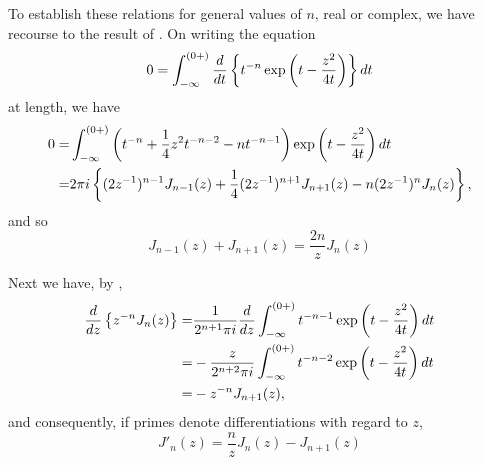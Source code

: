 \documentclass{book}
\begin{document}
To establish these relations for general values of $n$, real or
complex, we have recourse to the result of .
On writing the equation
$$
0 = \int_{-\infty}^{(0+)} \frac{d}{dt} \left\{  t^{-n}
  \exp\left(  t - \frac{z^2}{4t}   \right)   \right\} d t
$$
at length, we have
\begin{align*}
0 =& \int_{-\infty}^{(0+)}
\theparen{ t^{-n} + \frac{1}{4}z^2 t^{-n-2} - nt^{-n-1}  }
  \exp\theparen{ t - \frac{z^2}{4t}  }  \dmeasure t \\
%
  =& 2\pi i
  \thebrace{ (2z^{-1})^{n-1} J_{n-1}(z)
    + \frac{1}{4} (2z^{-1})^{n+1} J_{n+1}(z)
  - n (2z^{-1})^n J_n(z)},
\end{align*}
and so
\begin{equation}
J_{n-1}(z) + J_{n+1}(z) = \frac{2n}{z} J_n(z) 
\label{eq:bessel:recur}
\end{equation}

Next we have, by ,
\begin{align*}
  \frac{d}{dz} \left\{  z^{-n} J_n(z)   \right\}
  =& \frac{1}{2^{n+1}\pi i}
  \frac{d}{dz}
  \int_{-\infty}^{(0+)}
  t^{-n-1}
  \exp\left(  t - \frac{z^2}{4t}  \right)
  d t
  \\
  =& - \frac{z}{2^{n+2}\pi i}
  \int_{-\infty}^{(0+)}
  t^{-n-2}
  \exp\left(  t - \frac{z^2}{4t}  \right)
  d t
  \\
  =& -z^{-n} J_{n+1}(z),  
\end{align*}
%
%
and consequently, if primes denote differentiations with regard to
$z$,
\begin{equation}
  J'_n(z) = \frac{n}{z} J_n(z) - J_{n+1}(z)
\label{eq:bessel:deriv}
\end{equation}
\end{document}
